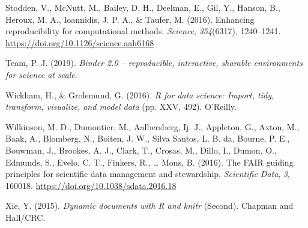 \documentclass[
  a4paper,
]{article}
\newlength{\cslhangindent}
\newenvironment{CSLReferences}[2] %
 {\begin{list}{}{%
  \setlength{\itemindent}{0pt}
  \setlength{\leftmargin}{0pt}
  \setlength{\parsep}{0pt}
  \ifodd #1
   \setlength{\leftmargin}{\cslhangindent}
   \setlength{\itemindent}{-1\cslhangindent}
  \fi
  \setlength{\itemsep}{#2\baselineskip}}}
 {\end{list}}
\begin{document}
\begin{CSLReferences}{1}{0}
Stodden, V., McNutt, M., Bailey, D. H., Deelman, E., Gil, Y., Hanson,
B., Heroux, M. A., Ioannidis, J. P. A., \& Taufer, M. (2016). Enhancing
reproducibility for computational methods. \emph{Science},
\emph{354}(6317), 1240--1241.
\url{https://doi.org/10.1126/science.aah6168}

Team, P. J. (2019). \emph{Binder 2.0 -- reproducible, interactive,
sharable environments for science at scale}.

Wickham, H., \& Grolemund, G. (2016). \emph{R for data science: Import,
tidy, transform, visualize, and model data} (pp. XXV, 492). O'Reilly.

Wilkinson, M. D., Dumontier, M., Aalbersberg, Ij. J., Appleton, G.,
Axton, M., Baak, A., Blomberg, N., Boiten, J. W., Silva Santos, L. B.
da, Bourne, P. E., Bouwman, J., Brookes, A. J., Clark, T., Crosas, M.,
Dillo, I., Dumon, O., Edmunds, S., Evelo, C. T., Finkers, R., \ldots{}
Mons, B. (2016). The FAIR guiding principles for scientific data
management and stewardship. \emph{Scientific Data}, \emph{3}, 160018.
\url{https://doi.org/10.1038/sdata.2016.18}

Xie, Y. (2015). \emph{Dynamic documents with {R} and knitr} (Second).
{Chapman and Hall/CRC}.

\end{CSLReferences}
\end{document}
